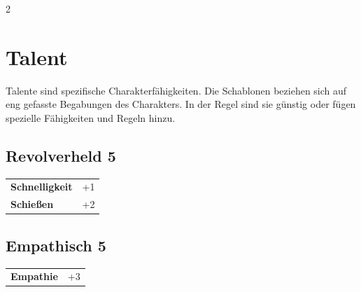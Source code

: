 \begin{multicols}{2}
\begin{tcolorbox}
\end{tcolorbox}

\section{Talent}

Talente sind spezifische Charakterfähigkeiten. Die Schablonen beziehen sich auf eng gefasste Begabungen des Charakters. In der Regel sind sie günstig oder fügen spezielle Fähigkeiten und Regeln hinzu.

\begin{tcolorbox}
    \subsection*{Revolverheld \hfill \small{5 }}
    \tcblower




\begin{tabular}{@{}ll@{}}
    \textbf{Schnelligkeit} & +1\\
    \textbf{Schießen} & +2\\
\end{tabular}


\end{tcolorbox}

\begin{tcolorbox}
    \subsection*{Empathisch \hfill \small{5 }}
    \tcblower




\begin{tabular}{@{}ll@{}}
    \textbf{Empathie} & +3\\
\end{tabular}


\end{tcolorbox}


\end{multicols}
